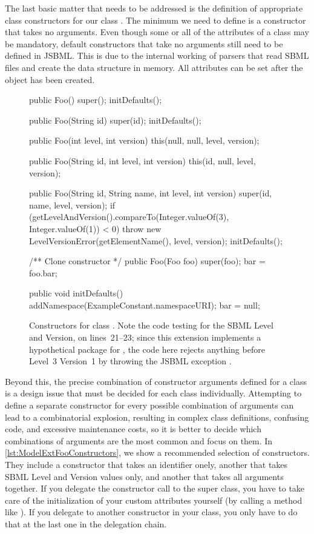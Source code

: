 The last basic matter that needs to be addressed is the definition of
appropriate class constructors for our class .  The minimum we
need to define is a constructor that takes no arguments.  Even though some
or all of the attributes of a class may be mandatory, default constructors
that take no arguments still need to be defined in JSBML.  This is due to
the internal working of parsers that read SBML files and create the data
structure in memory.  All attributes can be set after the object has been
created.

\begin{figure}[b]
  \begin{example}[numbers=left]
public Foo() {
  super();
  initDefaults();
}

public Foo(String id) {
  super(id);
  initDefaults();
}

public Foo(int level, int version){
  this(null, null, level, version);
}

public Foo(String id, int level, int version) {
  this(id, null, level, version);
}

public Foo(String id, String name, int level, int version) {
  super(id, name, level, version);
  if (getLevelAndVersion().compareTo(Integer.valueOf(3), Integer.valueOf(1)) < 0) {
    throw new LevelVersionError(getElementName(), level, version);
  }
  initDefaults();
}

/** Clone constructor */
public Foo(Foo foo) {
  super(foo);
  bar = foo.bar;
}

public void initDefaults() {
  addNamespace(ExampleConstant.namespaceURI);
  bar = null;
}\end{example}
  \caption{Constructors for class .  Note the code testing for
    the SBML Level and Version, on lines~21--23; since this extension
    implements a hypothetical package for \SBMLthree, the code here rejects
    anything before Level~3 Version~1 by throwing the JSBML exception
    \LevelVersionError.}
  \label{lst:ModelExtFooConstructors}
\end{figure}

Beyond this, the precise combination of constructor arguments defined for a
class is a design issue that must be decided for each class individually.
Attempting to define a separate constructor for every possible combination
of arguments can lead to a combinatorial explosion, resulting in complex
class definitions, confusing code, and excessive maintenance costs, so it
is better to decide which combinations of arguments are the most common and
focus on them.  In \vref{lst:ModelExtFooConstructors}, we show a
recommended selection of constructors.  They include a constructor that
takes an identifier onely, another that takes SBML Level and Version values
only, and another that takes all arguments together.  If you delegate the
constructor call to the super class, you have to take care of the
initialization of your custom attributes yourself (by calling a method like
).  If you delegate to another constructor in your
class, you only have to do that at the last one in the delegation chain.


